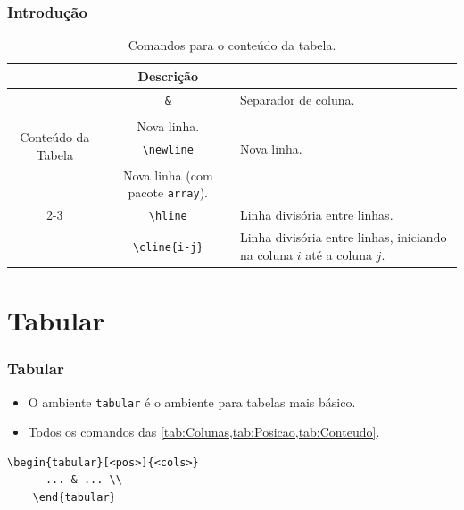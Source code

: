 \documentclass[brazilian]{beamer}
\begin{document}
\begin{frame}[fragile]
  \frametitle{Introdução}
  \footnotesize

  \begin{table}
    \caption{Comandos para o conteúdo da tabela.}
    \label{tab:Conteudo}
    \begin{tabular}[c]{c|c|m{5cm}}
      \firsthline
      \multicolumn{2}{c}{Comando}           & Descrição                                                                                            \\ \hline
      \multirow{6}{2cm}{Conteúdo da Tabela} & \texttt{\&}            & Separador de coluna.                                                        \\ \cline{2-3}
                                            & \lstinline[style=myStyleLatex]!\\! & Nova linha.                                                                 \\ \cline{2-3}
                                            & \lstinline[style=myStyleLatex]!\newline! & Nova linha.                                                                 \\ \cline{2-3}
                                            & \lstinline[style=myStyleLatex]!\tabularnewline! & Nova linha (com pacote \texttt{array}).                                     \\ \cline{2-3}
                                            & \lstinline[style=myStyleLatex]!\hline! & Linha divisória entre linhas.                                               \\ \cline{2-3}
                                            & \lstinline[style=myStyleLatex]!\cline{i-j}! & Linha divisória entre linhas, iniciando na coluna \(i\) até a coluna \(j\). \\ \hline
    \end{tabular}
  \end{table}
\end{frame}

\section{Tabular}
\begin{frame}[fragile]
  \frametitle{Tabular}

  \begin{itemize}
    \item O ambiente \texttt{tabular} é o ambiente para tabelas mais básico.
    \item Todos os comandos das \cref{tab:Colunas,tab:Posicao,tab:Conteudo}.
  \end{itemize}
  \begin{lstlisting}[style=myStyleLatex]
    \begin{tabular}[<pos>]{<cols>}
      ... & ... \\ 
    \end{tabular}
  \end{lstlisting}
\end{frame}
\end{document}
